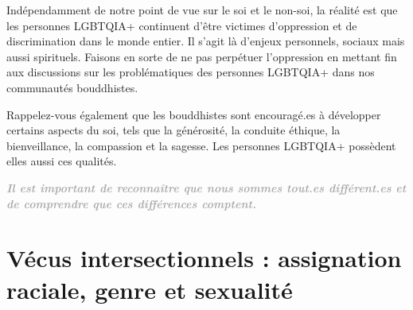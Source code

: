 \documentclass[12pt,openany]{book}
\renewenvironment{quote}{%
  \list{}{%
    \leftmargin-0.1cm   %
    \rightmargin\leftmargin
  }
  \item\relax
}
{\endlist}
\begin{document}
Indépendamment de notre point de vue sur le soi et le non-soi, la réalité est que les personnes \mbox{LGBTQIA+} continuent d’être victimes d’oppression et de discrimination dans le monde entier. Il s’agit là d’enjeux personnels, sociaux mais aussi spirituels. Faisons en sorte de ne pas perpétuer l’oppression en mettant fin aux discussions sur les problématiques des personnes \mbox{LGBTQIA+} dans nos communautés bouddhistes.

Rappelez-vous également que les bouddhistes sont encouragé.es à développer certains aspects du soi, tels que la générosité, la conduite éthique, la bienveillance, la compassion et la sagesse. Les personnes \mbox{LGBTQIA+} possèdent elles aussi ces qualités.

\begingroup
\begin{figure}[h]
    \centering
\end{figure}

\begin{quote}
\doublespacing
\centering
\textit{\Large \textbf{\textcolor{darkgray}{Il est important de reconnaître que nous sommes tout.es différent.es et de comprendre que ces différences comptent.}}}
\end{quote}
\endgroup

\newpage
{}
\section*{Vécus intersectionnels : \normalsize assignation raciale, genre et \mbox{sexualité}}
\end{document}

